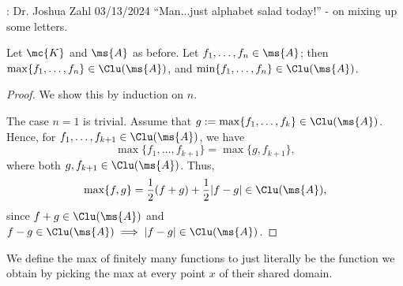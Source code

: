 \begin{nquote}{: Dr. Joshua Zahl 03/13/2024}
    ``Man...just alphabet salad today!'' - on mixing up some letters.
\end{nquote}

\begin{lemma}
    Let \(\mc{K}\) and \(\ms{A}\) as before. Let \(f_1,\dots,f_n\in\ms{A}\); then \(\max\{f_1,\dots,f_n\}\in\Clu(\ms{A})\), and \(\min\{f_1,\dots,f_n\}\in\Clu(\ms{A})\).\label{lemma 2}
\end{lemma}
\begin{proof}
    We show this by induction on \(n\).

    \medskip

    The case \(n=1\) is trivial. Assume that \(g:=\max\{f_1,\dots,f_k\}\in\Clu(\ms{A})\). Hence, for \(f_1,\dots,f_{k+1}\in\Clu(\ms{A})\), we have 
    \begin{equation*} 
        \max\{f_1,\dots,f_{k+1}\}=\max\{g,f_{k+1}\},
    \end{equation*}
    where both \(g,f_{k+1}\in\Clu(\ms{A})\). Thus, 
    \begin{equation*} 
        \max\{f,g\}=\frac{1}{2}(f+g)+\frac{1}{2}|f-g|\in\Clu(\ms{A}),
    \end{equation*}
    since \(f+g\in\Clu(\ms{A})\) and \(f-g\in\Clu(\ms{A})\implies |f-g|\in\Clu(\ms{A})\).
\end{proof}
\begin{note}
    We define the max of finitely many functions to just literally be the function we obtain by picking the max at every point \(x\) of their shared domain.
\end{note}

